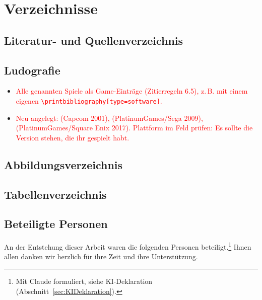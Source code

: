\documentclass[../Main.tex]{subfiles}
\begin{document}
\section{Verzeichnisse}

\subsection{Literatur- und Quellenverzeichnis}

\printbibliography[heading=none]

\subsection{Ludografie}

\begin{itemize}[leftmargin=1.5cm]
    \item \textcolor{red}{Alle genannten Spiele als Game-Einträge (Zitierregeln 6.5), z.\,B. mit einem eigenen \texttt{\textbackslash printbibliography[type=software]}.}
    \item \textcolor{red}{Neu angelegt:  (Capcom 2001),  (PlatinumGames/Sega 2009),  (PlatinumGames/Square Enix 2017). Plattform im Feld  prüfen: Es sollte die Version stehen, die ihr gespielt habt.}
\end{itemize}

\subsection{Abbildungsverzeichnis}

\listoffigures

\subsection{Tabellenverzeichnis}

\listoftables

\subsection{Beteiligte Personen} \label{sec:Beteiligte}

An der Entstehung dieser Arbeit waren die folgenden Personen beteiligt.\footnote{Mit Claude formuliert, siehe KI-Deklaration (Abschnitt~\ref{sec:KIDeklaration}).} Ihnen allen danken wir herzlich für ihre Zeit und ihre Unterstützung.
\end{document}
